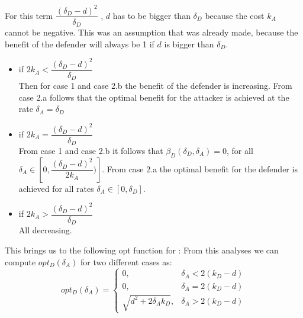 For this term $\dfrac{(\delta_{D}-d)^{2}}{\delta_{D}} $ , $d$ has to be bigger than  $\delta_{D}$ because the cost $k_{A}$ cannot be negative. This was an assumption that was already made, because the benefit of the defender will always be 1 if $d$ is bigger than  $\delta_{D}$.
\begin{itemize}
\item if $2k_{A} < \dfrac{(\delta_{D}-d)^{2}}{\delta_{D}} $ \\
Then for case 1 and case 2.b the benefit of the defender is increasing. From case 2.a follows that the optimal benefit for the attacker is achieved at the rate $\delta_{A} = \delta_{D}$
\item if $2k_{A} = \dfrac{(\delta_{D}-d)^{2}}{\delta_{D}} $ \\
From case 1 and case 2.b it follows that $\beta_{D}(\delta_{D},\delta_{A})=0$, for all $\delta_{A} \in [0,\dfrac{(\delta_{D}-d)^{2}}{2k_{A}})]$. From case 2.a the optimal benefit for the defender is achieved for all rates $\delta_{A} \in [0, \delta_{D}]$.
\item if $2k_{A} > \dfrac{(\delta_{D}-d)^{2}}{\delta_{D}} $ \\
All decreasing.
\end{itemize}

This brings us to the following opt function for : 
From this analyses we can compute $opt_{D}(\delta_{A})$ for two different cases as:
 \begin{displaymath}
  opt_{D}(\delta_{A}) = \left\{
     \begin{array}{lr}
       0, & \delta_{A} < 2(k_{D} - d)\\
       0, & \delta_{A} = 2(k_{D} - d) \\
       \sqrt{d^{2} + 2\delta_{A}k_{D}}, & \delta_{A} > 2(k_{D} - d)
     \end{array}
   \right.
\end{displaymath}

